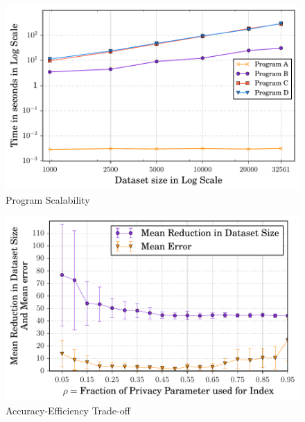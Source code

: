 \begin{figure}[b]
     \includegraphics[width=0.6\columnwidth]{scale_final.pdf}
        \caption{\system Program Scalability}\label{fig:scale}
\end{figure}

\begin{figure}[b]
  \includegraphics[width=0.6\columnwidth]{index_new.pdf}
  \caption{Accuracy-Efficiency Trade-off } \label{fig:Index}
\end{figure}


